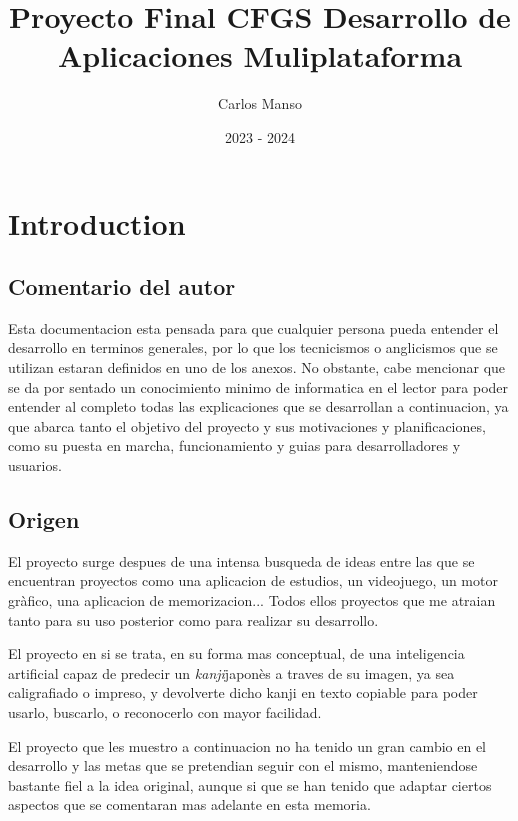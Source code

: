 \documentclass{article}
\title{Proyecto Final CFGS Desarrollo de Aplicaciones Muliplataforma}
\author{Carlos Manso}
\date{2023 - 2024}
\begin{document}
\clearpage\maketitle
\thispagestyle{empty}

\clearpage\tableofcontents
\thispagestyle{empty}


\section{Introduction}

\subsection{Comentario del autor}
Esta documentacion esta pensada para que cualquier persona pueda entender el desarrollo en terminos generales, por lo que los tecnicismos o anglicismos que se utilizan estaran definidos en uno de los anexos. No obstante, cabe mencionar que se da por sentado un conocimiento minimo de informatica en el lector para poder entender al completo todas las explicaciones que se desarrollan a continuacion, ya que abarca tanto el objetivo del proyecto y sus motivaciones y planificaciones, como su puesta en marcha, funcionamiento y guias para desarrolladores y usuarios.

\subsection{Origen}
El proyecto surge despues de una intensa busqueda de ideas entre las que se encuentran proyectos como una aplicacion de estudios, un videojuego, un motor gr\`afico, una aplicacion de memorizacion... Todos ellos proyectos que me atraian tanto para su uso posterior como para realizar su desarrollo.

El proyecto en si se trata, en su forma mas conceptual, de una inteligencia artificial capaz de predecir un \textit{kanji}\rep japon\`es a traves de su imagen, ya sea caligrafiado o impreso, y devolverte dicho kanji en texto copiable para poder usarlo, buscarlo, o reconocerlo con mayor facilidad.

El proyecto que les muestro a continuacion no ha tenido un gran cambio en el desarrollo y las metas que se pretendian seguir con el mismo, manteniendose bastante fiel a la idea original, aunque si que se han tenido que adaptar ciertos aspectos que se comentaran mas adelante en esta memoria.
\end{document}
